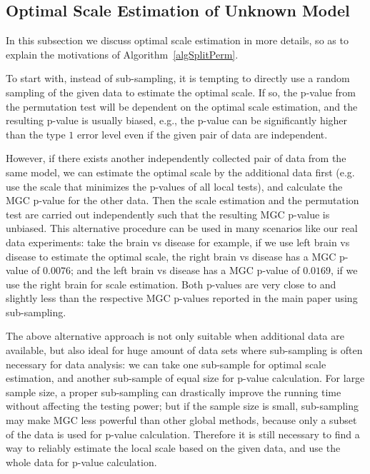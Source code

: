\documentclass[11pt]{article}
\begin{document}
\subsection{Optimal Scale Estimation of Unknown Model}
\label{appen:discuss}
In this subsection we discuss optimal scale estimation in more details, so as to explain the motivations of Algorithm~\ref{algSplitPerm}.

To start with, instead of sub-sampling, it is tempting to directly use a random sampling of the given data to estimate the optimal scale. If so, the p-value from the permutation test will be dependent on the optimal scale estimation, and the resulting p-value is usually biased, e.g., the p-value can be significantly higher than the type $1$ error level even if the given pair of data are independent. 

However, if there exists another independently collected pair of data from the same model, we can estimate the optimal scale by the additional data first (e.g. use the scale that minimizes the p-values of all local tests), and calculate the MGC p-value for the other data. Then the scale estimation and the permutation test are carried out independently such that the resulting MGC p-value is unbiased. This alternative procedure can be used in many scenarios like our real data experiments: take the brain vs disease for example, if we use left brain vs disease to estimate the optimal scale, the right brain vs disease has a MGC p-value of $0.0076$; and the left brain vs disease has a MGC p-value of $0.0169$, if we use the right brain for scale estimation. Both p-values are very close to and slightly less than the respective MGC p-values reported in the main paper using sub-sampling.

The above alternative approach is not only suitable when additional data are available, but also ideal for huge amount of data sets where sub-sampling is often necessary for data analysis: we can take one sub-sample for optimal scale estimation, and another sub-sample of equal size for p-value calculation. For large sample size, a proper sub-sampling can drastically improve the running time without affecting the testing power; but if the sample size is small, sub-sampling may make MGC less powerful than other global methods, because only a subset of the data is used for p-value calculation. Therefore it is still necessary to find a way to reliably estimate the local scale based on the given data, and use the whole data for p-value calculation.
\end{document}
